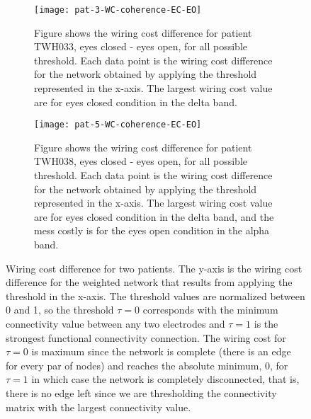 \documentclass[11pt, onecolumn]{article}
\begin{document}
\begin{figure}[ht] 
  \begin{subfigure}[t]{0.5\linewidth}
    \centering
    \texttt{[image: pat-3-WC-coherence-EC-EO]} 
    \caption{Figure shows the wiring cost difference for patient TWH033, eyes closed - eyes open, for all possible threshold. Each data point is the wiring cost difference for the network obtained by applying the threshold represented in the x-axis. The largest wiring cost value are for eyes closed condition in the delta band.} 
    \label{fig0:a} 
    \vspace{4ex}
  \end{subfigure}%
  \hspace{1ex}
  \begin{subfigure}[t]{0.5\linewidth}
    \centering
    \texttt{[image: pat-5-WC-coherence-EC-EO]} 
    \caption{Figure shows the wiring cost difference for patient TWH038, eyes closed - eyes open, for all possible threshold. Each data point is the wiring cost difference for the network obtained by applying the threshold represented in the x-axis. The largest wiring cost value are for eyes closed condition in the delta band, and the mess costly is for the eyes open condition in the alpha band.} 
    \label{fig0:b} 
    \vspace{4ex}
  \end{subfigure} 
  \caption{Wiring cost difference for two patients. The y-axis is the wiring cost difference for the weighted network that results from applying the threshold in the x-axis. The threshold values are normalized between 0 and 1, so the threshold $\tau = 0$ corresponds with the minimum connectivity value between any two electrodes and  $\tau = 1$ is the strongest functional connectivity connection. The wiring cost for  $\tau = 0$ is maximum since the network is complete (there is an edge for every par of nodes) and reaches the absolute minimum, 0, for $\tau = 1$ in which case the network is completely  disconnected, that is, there is no edge left since we are thresholding the connectivity matrix with the largest connectivity value.}
  \label{fig:wcindivpats} 
\end{figure}
\end{document}
